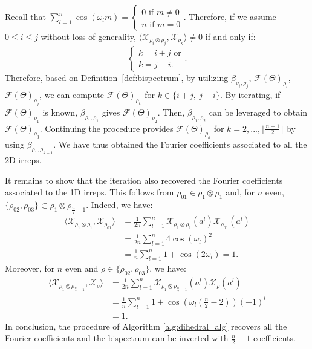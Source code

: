 \documentclass{article}
\theoremstyle{plain}
\theoremstyle{definition}
\theoremstyle{remark}
\begin{document}
Recall that $\sum_{l=1}^n\cos(\omega_l m)=\begin{cases}
        0 \text{ if } m\neq 0\\
        n \text{ if } m = 0
    \end{cases}$. Therefore, if we assume $0\leq i\leq j$ without loss of generality, $ \langle \mathcal{X}_{\rho_i\otimes\rho_j},\mathcal{X}_{\rho_k}\rangle\neq 0$ if and only if:
\begin{equation*}
    \begin{cases}
        k = i+j \text{ or}\\
        k = j-i.
    \end{cases}.
\end{equation*}
Therefore, based on Definition~\ref{def:bispectrum}, by utilizing $\beta_{\rho_i,\rho_j}$, $\mathcal{F}(\Theta)_{\rho_i}$, $\mathcal{F}(\Theta)_{\rho_j}$, we can compute  $\mathcal{F}(\Theta)_{\rho_k}$ for $k\in\{i+j,\ j-i\}$. By iterating, if $\mathcal{F}(\Theta)_{\rho_1}$ is known,  $\beta_{\rho_1,\rho_1}$ gives $\mathcal{F}(\Theta)_{\rho_2}$. Then, $\beta_{\rho_1,\rho_2}$ can be leveraged to obtain  $\mathcal{F}(\Theta)_{\rho_3}$. Continuing the procedure provides $\mathcal{F}(\Theta)_{\rho_k}$ for $k=2,...,\lfloor \frac{n-1}{2}\rfloor$ by using $\beta_{\rho_1,\rho_{k-1}}$. We have thus obtained the Fourier coefficients associated to all the 2D irreps.

It remains to show that the iteration also recovered the Fourier coefficients associated to the 1D irreps. This follows from $\rho_{01}\in\rho_1\otimes\rho_1$ and, for $n$ even, $\{\rho_{02}, \rho_{03}\}\subset\rho_1\otimes\rho_{\frac{n}{2}-1}$. Indeed, we have:
\begin{align*}
    \langle \mathcal{X}_{\rho_1\otimes\rho_1},\mathcal{X}_{\rho_{01}}\rangle &=\frac{1}{2n}\sum_{l=1}^n \mathcal{X}_{\rho_1\otimes\rho_1}(a^l)\mathcal{X}_{\rho_{01}}(a^l)\\
    &=\frac{1}{2n}\sum_{l=1}^n 4\cos(\omega_l)^2\\
    &=\frac{1}{n}\sum_{l=1}^n 1+\cos(2\omega_l)=1.
\end{align*}
Moreover, for $n$ even and $\rho\in\{\rho_{02}, \rho_{03}\}$, we have:
\begin{align*}
    \langle \mathcal{X}_{\rho_1\otimes\rho_{\frac{n}{2}-1}},\mathcal{X}_\rho\rangle &=\frac{1}{2n}\sum_{l=1}^n \mathcal{X}_{\rho_1\otimes\rho_{\frac{n}{2}-1}}(a^l)\mathcal{X}_\rho(a^l)\\
    &=\frac{1}{n}\sum_{l=1}^n 1+\cos\left(\omega_l\left(\frac{n}{2}-2\right)\right)(-1)^l\\
    &=1.
\end{align*}
In conclusion, the procedure of Algorithm \ref{alg:dihedral_alg} recovers all the Fourier coefficients and the bispectrum can be inverted with $\frac{n}{2}+1$ coefficients.
\end{document}
